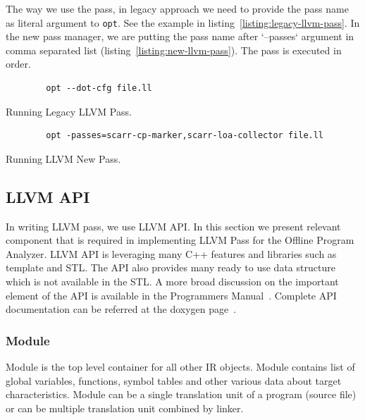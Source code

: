 The way we use the pass, in legacy approach we need to provide the pass name as
literal argument to \texttt{opt}. See the example in
listing~\ref{listing:legacy-llvm-pass}. In the new pass manager, we are putting
the pass name after `--passes` argument in comma separated list
(listing~\ref{listing:new-llvm-pass}). The pass is executed in order.

\begin{listing}[htbp]
    \begin{verbatim}
        opt --dot-cfg file.ll 
    \end{verbatim}
    \caption{Running Legacy LLVM Pass.}    
    \label{listing:legacy-llvm-pass}
\end{listing}

\begin{listing}[htpb]
    \begin{verbatim}
        opt -passes=scarr-cp-marker,scarr-loa-collector file.ll 
    \end{verbatim}
    \caption{Running LLVM New Pass.}    
    \label{listing:new-llvm-pass}
\end{listing}

\subsection{LLVM API}

In writing LLVM pass, we use LLVM API. In this section we present relevant
component that is required in implementing LLVM Pass for the Offline Program
Analyzer. LLVM API is leveraging many C++ features and libraries such as
template and STL. The API also provides many ready to use data structure which
is not available in the STL. A more broad discussion on the important element of
the API is available in the Programmers Manual~\cite{LLVMProgrammerManuala}.
Complete API documentation can be referred at the doxygen page~\cite{LLVMLLVMa}.

\subsubsection{Module}

Module is the top level container for all other IR objects. Module contains list
of global variables, functions, symbol tables and other various data about
target characteristics. Module can be a single translation unit of a program
(source file) or can be multiple translation unit combined by linker. 

